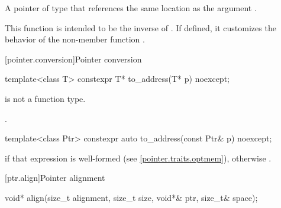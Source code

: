 \begin{itemdescr}
\pnum
\returns
A pointer of type  that references
the same location as the argument .

\pnum
\begin{note}
This function is intended to be the inverse of .
If defined, it customizes the behavior of
the non-member function
.
\end{note}
\end{itemdescr}

[pointer.conversion]{Pointer conversion}

%
\begin{itemdecl}
template<class T> constexpr T* to_address(T* p) noexcept;
\end{itemdecl}

\begin{itemdescr}
\pnum
\mandates
{} is not a function type.

\pnum
\returns
{}.
\end{itemdescr}

%
\begin{itemdecl}
template<class Ptr> constexpr auto to_address(const Ptr& p) noexcept;
\end{itemdecl}

\begin{itemdescr}
\pnum
\returns
{} if that expression is well-formed
(see \ref{pointer.traits.optmem}),
otherwise .
\end{itemdescr}

[ptr.align]{Pointer alignment}

%
\begin{itemdecl}
void* align(size_t alignment, size_t size, void*& ptr, size_t& space);
\end{itemdecl}

